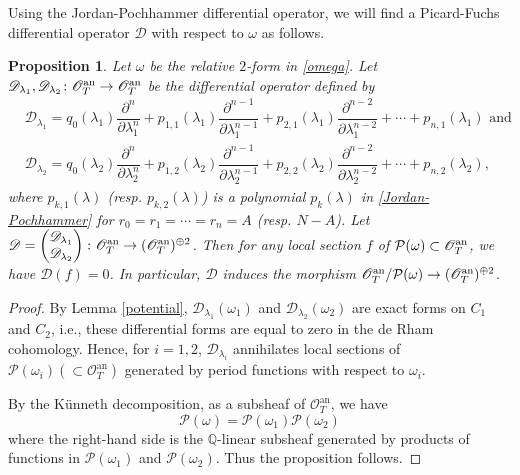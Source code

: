 \documentclass[letterpaper, 11pt]{amsart}
\theoremstyle{my theoremstyle}
\newtheorem{prop}[thm]{Proposition}
\theoremstyle{dfn}
\theoremstyle{remark}
\renewcommand{\1}{\mathbbm{1}}
\newcommand{\Q}{\mathbb{Q}}
\renewcommand{\l}{\lambda}
\numberwithin{equation}{section}
\begin{document}
Using the Jordan-Pochhammer differential operator, we will find a Picard-Fuchs differential operator $\mathscr{D}$ with respect to $\omega$ as follows.

\begin{prop} \label{PF}
Let $\omega$ be the relative $2$-form in \eqref{omega}. 
Let $\mathscr{ D}_{\l_1}, \mathscr{D}_{\l_2} \colon \mathscr{O}_T^{\rm an} \to \mathscr{O}_T^{\rm an}$ be the differential operator defined by 
\begin{align*}
&\mathscr{D}_{\l_1}=q_0(\l_1) \dfrac{\partial^n}{\partial\l_1^n}+p_{1,1}(\l_1) \dfrac{\partial^{n-1}}{\partial\l_1^{n-1}}+p_{2,1}(\l_1) \dfrac{\partial^{n-2}}{\partial\l_1^{n-2}} + \cdots + p_{n,1}(\l_1) \text{ and} \\
&\mathscr{D}_{\l_2}=q_0(\l_2) \dfrac{\partial^n}{\partial\l_2^n}+p_{1,2}(\l_2) \dfrac{\partial^{n-1}}{\partial\l_2^{n-1}}+p_{2,2}(\l_2) \dfrac{\partial^{n-2}}{\partial\l_2^{n-2}}+\cdots + p_{n,2}(\l_2),
\end{align*}
where $p_{k,1}(\l)$ (resp. $p_{k,2}(\l)$) is a polynomial $p_k(\l)$  in \eqref{Jordan-Pochhammer} for $r_0=r_1=\cdots =r_n=A$ (resp. $N-A$). 
Let $\mathscr{D}=
\begin{pmatrix} 
\mathscr{D}_{\l_1} \\
\mathscr{D}_{\l_2} 
\end{pmatrix}
\colon \mathscr{O}_T^{\rm an} \to ( \mathscr{O}_T^{\rm an})^{\oplus 2}$. 
Then for any local section $f$ of $\mathcal{P}({\omega}) \subset \mathscr{O}^{\rm an}_T$, we have $\mathscr{D}(f)=0$.
In particular,  $\mathscr{D}$ induces the morphism $\mathscr{O}_T^{\mathrm{an}}/\mathcal{P}({\omega}) \to (\mathscr{O}^{\rm an}_T)^{\oplus 2}$. 
\end{prop}

\begin{proof}
By Lemma \ref{potential}, $\mathscr{D}_{\l_1}(\omega_1)$ and $\mathscr{D}_{\l_2}(\omega_2)$ are exact forms on $C_1$ and $C_2$, i.e., these differential forms are equal to zero in the de Rham cohomology. 
Hence, for $i=1,2$, $\mathscr{D}_{\l_i}$ annihilates local sections of $\mathcal{P}(\omega_i)(\subset \mathscr{O}_T^{\mathrm{an}})$ generated by period functions with respect to $\omega_i$.

By the K\"unneth decomposition, as a subsheaf of $\mathscr{O}_T^{\mathrm{an}}$, we have 
\begin{equation*}
\mathcal{P}(\omega) = \mathcal{P}(\omega_1)\mathcal{P}(\omega_2)
\end{equation*}
where the right-hand side is the $\Q$-linear subsheaf generated by products of functions in $\mathcal{P}(\omega_1)$ and $\mathcal{P}(\omega_2)$.
Thus the proposition follows.
 
\end{proof}
\end{document}
